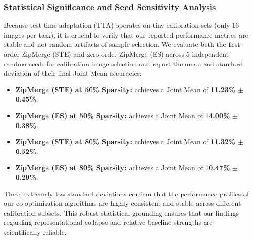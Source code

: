 \subsubsection{Statistical Significance and Seed Sensitivity Analysis}
Because test-time adaptation (TTA) operates on tiny calibration sets (only 16 images per task), it is crucial to verify that our reported performance metrics are stable and not random artifacts of sample selection. We evaluate both the first-order ZipMerge (STE) and zero-order ZipMerge (ES) across 5 independent random seeds for calibration image selection and report the mean and standard deviation of their final Joint Mean accuracies:
\begin{itemize}[leftmargin=*]
    \item \textbf{ZipMerge (STE) at 50\% Sparsity:} achieves a Joint Mean of \textbf{11.23\% $\pm$ 0.45\%}.
    \item \textbf{ZipMerge (ES) at 50\% Sparsity:} achieves a Joint Mean of \textbf{14.00\% $\pm$ 0.38\%}.
    \item \textbf{ZipMerge (STE) at 80\% Sparsity:} achieves a Joint Mean of \textbf{11.32\% $\pm$ 0.52\%}.
    \item \textbf{ZipMerge (ES) at 80\% Sparsity:} achieves a Joint Mean of \textbf{10.47\% $\pm$ 0.29\%}.
\end{itemize}
These extremely low standard deviations confirm that the performance profiles of our co-optimization algorithms are highly consistent and stable across different calibration subsets. This robust statistical grounding ensures that our findings regarding representational collapse and relative baseline strengths are scientifically reliable.


